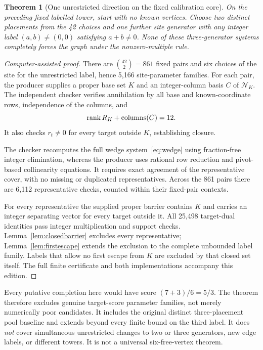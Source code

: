 \documentclass[11pt,letterpaper]{article}
\newtheorem{theorem}{Theorem}[section]
\theoremstyle{definition}
\theoremstyle{remark}\newtheorem{remark}[theorem]{Remark}
\begin{document}
\begin{theorem}[One unrestricted direction on the fixed calibration core]\label{thm:onefree}
On the preceding fixed labelled tower, start with no known vertices. Choose two distinct placements from the 42 choices and one further site generator with any integer label $(a,b)\ne(0,0)$ satisfying $a+b\ne0$. None of these three-generator systems completely forces the graph under the nonzero-multiple rule.
\end{theorem}
\begin{proof}[Computer-assisted proof]
There are $\binom{42}{2}=861$ fixed pairs and six choices of the site for the unrestricted label, hence 5,166 site-parameter families. For each pair, the producer supplies a proper base set $K$ and an integer-column basis $C$ of $\mathcal N_K$. The independent checker verifies annihilation by all base and known-coordinate rows, independence of the columns, and
\[
\operatorname{rank} R_K+\operatorname{columns}(C)=12.
\]
It also checks $r_t\ne0$ for every target outside $K$, establishing closure.

The checker recomputes the full wedge system~\eqref{eq:wedge} using fraction-free integer elimination, whereas the producer uses rational row reduction and pivot-based collinearity equations. It requires exact agreement of the representative cover, with no missing or duplicated representatives. Across the 861 pairs there are 6,112 representative checks, counted within their fixed-pair contexts.

For every representative the supplied proper barrier contains $K$ and carries an integer separating vector for every target outside it. All 25,498 target-dual identities pass integer multiplication and support checks. Lemma~\ref{lem:closedbarrier} excludes every representative; Lemma~\ref{lem:firstescape} extends the exclusion to the complete unbounded label family. Labels that allow no first escape from $K$ are excluded by that closed set itself. The full finite certificate and both implementations accompany this edition.
\end{proof}
Every putative completion here would have score $(7+3)/6=5/3$. The theorem therefore excludes genuine target-score parameter families, not merely numerically poor candidates. It includes the original distinct three-placement pool baseline and extends beyond every finite bound on the third label. It does \emph{not} cover simultaneous unrestricted changes to two or three generators, new edge labels, or different towers. It is not a universal six-free-vertex theorem.
\end{document}
